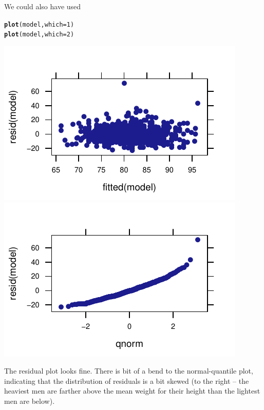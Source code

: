 \documentclass[twoside]{book}\usepackage[]{graphicx}\usepackage[]{xcolor}
\makeatletter
\def\maxwidth{ %
  \ifdim\Gin@nat@width>\linewidth
    \linewidth
  \else
    \Gin@nat@width
  \fi
}
\newcommand{\hlnum}[1]{\textcolor[rgb]{0.686,0.059,0.569}{#1}}%
\newcommand{\hlstd}[1]{\textcolor[rgb]{0.345,0.345,0.345}{#1}}%
\newcommand{\hlkwc}[1]{\textcolor[rgb]{0.333,0.667,0.333}{#1}}%
\newcommand{\hlkwd}[1]{\textcolor[rgb]{0.737,0.353,0.396}{\textbf{#1}}}%
\newenvironment{kframe}{%
 \def\at@end@of@kframe{}%
 \ifinner\ifhmode%
  \def\at@end@of@kframe{\end{minipage}}%
  \begin{minipage}{\columnwidth}%
 \fi\fi%
 \def\FrameCommand##1{\hskip\@totalleftmargin \hskip-\fboxsep
 \colorbox{shadecolor}{##1}\hskip-\fboxsep
     \hskip-\linewidth \hskip-\@totalleftmargin \hskip\columnwidth}%
 \MakeFramed {\advance\hsize-\width
   \@totalleftmargin\z@ \linewidth\hsize
   \@setminipage}}%
 {\par\unskip\endMakeFramed%
 \at@end@of@kframe}
\newenvironment{knitrout}{}{} %
\makeatother
\begin{document}
\begin{solution}
\begin{enumerate}
\begin{knitrout}
{}



\end{knitrout}
We could also have used
\begin{knitrout}
\color{fgcolor}\begin{kframe}
\begin{alltt}
\hlkwd{plot}\hlstd{(model,} \hlkwc{which}\hlstd{=}\hlnum{1}\hlstd{)}
\hlkwd{plot}\hlstd{(model,} \hlkwc{which}\hlstd{=}\hlnum{2}\hlstd{)}
\end{alltt}
\end{kframe}

{\centering \includegraphics[width=\maxwidth]{figures/fig-unnamed-chunk-194-1} 
\includegraphics[width=\maxwidth]{figures/fig-unnamed-chunk-194-2} 

}



\end{knitrout}
The residual plot looks fine.  There is bit of a bend to the normal-quantile plot, indicating
that the distribution of residuals is a bit skewed (to the right -- the heaviest men are farther above
the mean weight for their height than the lightest men are below).


\end{enumerate}
\end{solution}
\end{document}
